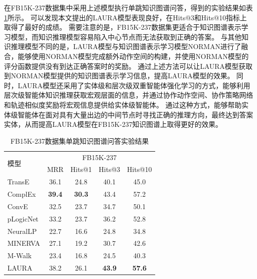 \documentclass[algorithmlist, AutoFakeBold, AutoFakeSlant, figurelist, tablelist, nomlist, engineering]{seuthesix}
\begin{document}
在FB15K-237数据集中采用上述模型执行单跳知识图谱问答，得到的实验结果如表\ref{Experiment2_FB15K-237}所示。
可以发现本文提出的LAURA模型表现良好，在Hits@3和Hits@10指标上取得了最好的成绩。
需要注意的是，FB15K-237数据集更适合于知识图谱表示学习模型，而知识推理模型容易陷入中心节点而无法获取到正确的答案。
与其他知识推理模型不同的是，LAURA模型与知识图谱表示学习模型NORMAN进行了融合，能够使用NORMAN模型完成额外动作空间的构建，并使用NORMAN模型的评分函数提供没有到达正确答案时的奖励。
通过上述方法可以让LAURA模型获取到NORMAN模型提供的知识图谱表示学习信息，提高LAURA模型的效果。
同时，LAURA模型还采用了实体级和层次级双重智能体强化学习的方式，能够利用层次级智能体知识推理获取宏观层面的信息，并通过协作动作空间、协作策略网络和轨迹相似度奖励将宏观信息提供给实体级智能体。
通过这种方式，能够帮助实体级智能体在面对具有大量出边的中间节点时寻找正确的推理方向，最终达到答案实体，从而提高LAURA模型在FB15K-237知识图谱上取得更好的效果。
\begin{table}[]
  \centering
  \begin{tabular*}{0.95\textwidth}{@{\extracolsep{\fill}}lcccc}
  \toprule[1pt]
  \multirow{2}{*}{模型} & \multicolumn{4}{c}{FB15K-237}   \\
    & MRR & Hits@1 & Hits@3 & Hits@10 \\ \hline
  TransE & 36.1 & 24.8 & 40.1 & 45.0 \\
  ComplEx & \textbf{39.4} & \textbf{30.3} & 43.4 & 57.2 \\
  ConvE & 32.5 & 23.7 & 34.7 & 50.1 \\
  pLogicNet & 33.2 & 23.7 & 36.2 & 52.8 \\
  NeuralLP & 22.7 & 16.6 & 24.8 & 34.8 \\
  MINERVA & 27.1 & 19.2 & 30.7 & 42.6 \\
  M-Walk & 23.4 & 16.8 & 24.5 & 40.3 \\
  LAURA & 38.2 & 26.1 & \textbf{43.9} & \textbf{57.6} \\
  \bottomrule[1pt]
  \end{tabular*}
  \caption{FB15K-237数据集单跳知识图谱问答实验结果}
  \label{Experiment2_FB15K-237}
\end{table}
\end{document}
